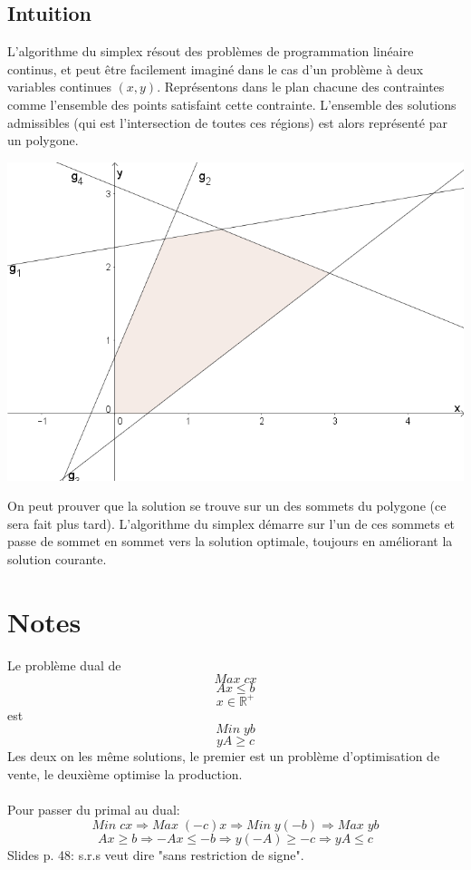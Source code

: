\documentclass[a4paper]{report}
\theoremstyle{definition}
\theoremstyle{remark}
\theoremstyle{plain}
\begin{document}
\subsection{Intuition}
L'algorithme du simplex résout des problèmes de programmation linéaire continus,
et peut être facilement imaginé dans le cas d'un problème à deux variables
continues \((x,y)\). Représentons dans le plan chacune des contraintes comme
l'ensemble des points satisfaint cette contrainte. L'ensemble des solutions
admissibles (qui est l'intersection de toutes ces régions) est alors représenté
par un polygone.
\begin{center}\textbf{\textbf{}}
\includegraphics[width=\textwidth]{simplex-xy.png}
\end{center}
On peut prouver que la solution se trouve sur un des sommets du polygone (ce
sera fait plus tard). L'algorithme du simplex démarre sur l'un de ces sommets et
passe de sommet en sommet vers la solution optimale, toujours en améliorant la
solution courante.

\section{Notes}
Le problème dual de
\[Max\;cx\]
\[Ax\le b\]
\[x\in\mathbb{R}^+\]
est
\[Min\;yb\]
\[yA\ge c\]
Les deux on les même solutions, le premier est un problème d'optimisation de
vente, le deuxième optimise la production.
\paragraph{}
Pour passer du primal au dual:
\[Min\;cx\Rightarrow Max\;(-c)x\Rightarrow Min\;y(-b)\Rightarrow Max\;yb\]
\[Ax\ge b\Rightarrow -Ax\le -b\Rightarrow y(-A)\ge -c\Rightarrow yA\le c\]
Slides p. 48: s.r.s veut dire "sans restriction de signe".
\end{document}
